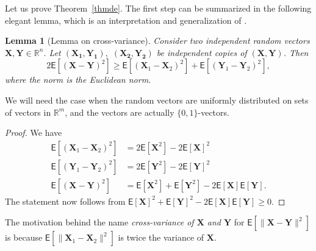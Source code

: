 \documentclass[graybox]{svmult}
\renewcommand{\ge}{\geqslant}
\newcommand{\R}{\mathbb{R}}
\renewcommand{\E}{\mathsf{E}}
\newtheorem{lem}[thm]{Lemma}
\begin{document}
Let us prove Theorem~\ref{thmde}. The first step can be summarized in the following elegant lemma, which is an interpretation and generalization of \cite[Theorem 2.1]{D0}.

\begin{lem}[Lemma on cross-variance]\label{lemcrossvar} Consider two independent random vectors $\mathbf X, \mathbf Y\in \mathbb R^n$. Let $(\mathbf{X_1},\mathbf{Y_1}),$ $(\mathbf{X_2},\mathbf{Y_2})$ be independent copies of $(\mathbf X,\mathbf Y)$.  Then
\begin{equation}\label{eqcrossvar} 2\E[(\mathbf X-\mathbf Y)^2]\ge \E[(\mathbf X_1-\mathbf X_2)^2]+\E[(\mathbf Y_1-\mathbf Y_2)^2],\end{equation}
where the norm is the Euclidean norm.
\end{lem}
We will need the case when the random vectors are uniformly distributed on sets of vectors in $\R^m$, and the vectors are actually $\{0,1\}$-vectors.
\begin{proof}
  We have \begin{align*}
            \E[(\mathbf X_1-\mathbf X_2)^2]&=2\E[\mathbf X^2]-2\E[\mathbf X]^2 \\
            \E[(\mathbf Y_1-\mathbf Y_2)^2]&=2\E[\mathbf Y^2]-2\E[\mathbf Y]^2 \\
            \E[(\mathbf X-\mathbf Y)^2]&= \E[\mathbf X^2]+\E[\mathbf Y^2]-2\E[\mathbf X]\E[\mathbf Y].
              \end{align*}
  The statement now follows from $\E[\mathbf X]^2+\E[\mathbf Y]^2-2\E[\mathbf X]\E[\mathbf Y]\ge 0$.
\end{proof}
The motivation behind the name {\em cross-variance of $\mathbf X$ and $\mathbf Y$} for $\E[\|\mathbf X-\mathbf Y\|^2]$ is because $\E[\|\mathbf X_1-\mathbf X_2\|^2]$ is twice the variance of $\mathbf X$.
\end{document}

